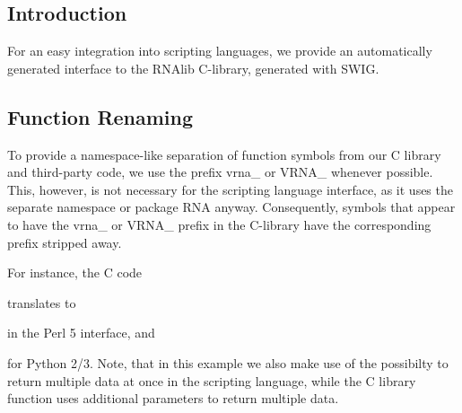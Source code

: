 \hypertarget{wrappers_scripting_intro}{}\subsection{Introduction}\label{wrappers_scripting_intro}
For an easy integration into scripting languages, we provide an automatically generated interface to the R\+N\+Alib C-\/library, generated with S\+W\+IG.\hypertarget{wrappers_scripting_renaming}{}\subsection{Function Renaming}\label{wrappers_scripting_renaming}
To provide a namespace-\/like separation of function symbols from our C library and third-\/party code, we use the prefix {\ttfamily vrna\+\_\+} or {\ttfamily V\+R\+N\+A\+\_\+} whenever possible. This, however, is not necessary for the scripting language interface, as it uses the separate namespace or package {\ttfamily R\+NA} anyway. Consequently, symbols that appear to have the {\ttfamily vrna\+\_\+} or {\ttfamily V\+R\+N\+A\+\_\+} prefix in the C-\/library have the corresponding prefix stripped away.

For instance, the C code 
\begin{DoxyCode}{0}
\end{DoxyCode}
 translates to 
\begin{DoxyCode}{0}
\end{DoxyCode}
 in the Perl 5 interface, and 
\begin{DoxyCode}{0}
\end{DoxyCode}
 for Python 2/3. Note, that in this example we also make use of the possibilty to return multiple data at once in the scripting language, while the C library function uses additional parameters to return multiple data.

